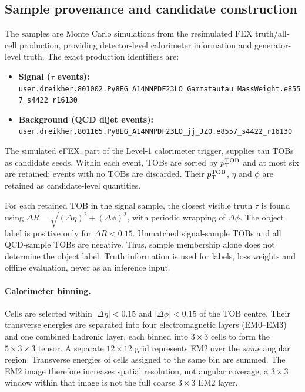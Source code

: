 \subsection{Sample provenance and candidate construction}
\label{app:sample_provenance}
The samples are Monte Carlo simulations from the resimulated FEX truth/all-cell production, providing detector-level calorimeter information and generator-level truth. The exact production identifiers are:
\begin{itemize}
  \item \textbf{Signal ($\tau$ events):}\newline
  {\footnotesize\nolinkurl{user.dreikher.801002.Py8EG_A14NNPDF23LO_Gammatautau_MassWeight.e8557_s4422_r16130}}
  \item \textbf{Background (QCD dijet events):}\newline
  {\footnotesize\nolinkurl{user.dreikher.801165.Py8EG_A14NNPDF23LO_jj_JZ0.e8557_s4422_r16130}}
\end{itemize}
The simulated eFEX, part of the Level-1 calorimeter trigger, supplies tau TOBs as candidate seeds. Within each event, TOBs are sorted by $p_{\mathrm{T}}^{\mathrm{TOB}}$ and at most six are retained; events with no TOBs are discarded. Their $p_{\mathrm{T}}^{\mathrm{TOB}}$, $\eta$ and $\phi$ are retained as candidate-level quantities.

For each retained TOB in the signal sample, the closest visible truth $\tau$ is found using $\Delta R=\sqrt{(\Delta\eta)^2+(\Delta\phi)^2}$, with periodic wrapping of $\Delta\phi$. The object label is positive only for $\Delta R<0.15$. Unmatched signal-sample TOBs and all QCD-sample TOBs are negative. Thus, sample membership alone does not determine the object label. Truth information is used for labels, loss weights and offline evaluation, never as an inference input.

\paragraph{Calorimeter binning.}
Cells are selected within $|\Delta\eta|<0.15$ and $|\Delta\phi|<0.15$ of the TOB centre. Their transverse energies are separated into four electromagnetic layers (EM0--EM3) and one combined hadronic layer, each binned into $3\times3$ cells to form the $5\times3\times3$ tensor. A separate $12\times12$ grid represents EM2 over the \emph{same} angular region. Transverse energies of cells assigned to the same bin are summed. The EM2 image therefore increases spatial resolution, not angular coverage; a $3\times3$ window within that image is not the full coarse $3\times3$ EM2 layer.

